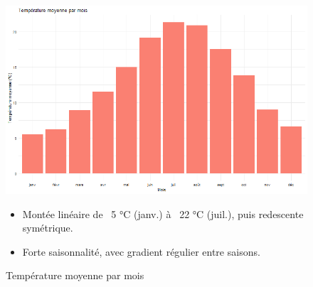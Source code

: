 \documentclass[12pt,a4paper]{article}
\begin{document}
\begin{figure}[H]
  \centering
  \begin{minipage}[t]{0.48\textwidth}
    \centering
    \includegraphics[width=\linewidth]{Projet_partie_A/temp_moyenne_par_mois.png}
    \caption{Température moyenne par mois}
    \label{fig:temp_moyenne_mois}
  \end{minipage}
  \hfill
  \begin{minipage}[t]{0.48\textwidth}
    \small
    \begin{itemize}
      \item Montée linéaire de ~5 °C (janv.) à ~22 °C (juil.), puis redescente symétrique.  
      \item Forte saisonnalité, avec gradient régulier entre saisons.  
    \end{itemize}
  \end{minipage}
\end{figure}
\end{document}
